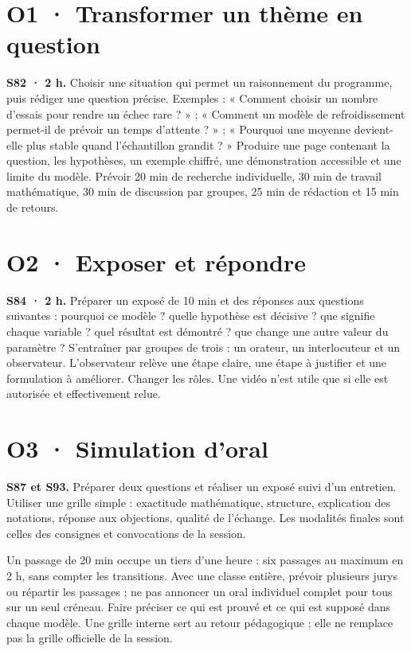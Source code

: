 \section{O1 · Transformer un thème en question}
\textbf{S82 · 2 h.} Choisir une situation qui permet un raisonnement du programme, puis rédiger une question précise. Exemples : « Comment choisir un nombre d'essais pour rendre un échec rare ? » ; « Comment un modèle de refroidissement permet-il de prévoir un temps d'attente ? » ; « Pourquoi une moyenne devient-elle plus stable quand l'échantillon grandit ? »
Produire une page contenant la question, les hypothèses, un exemple chiffré, une démonstration accessible et une limite du modèle. Prévoir 20 min de recherche individuelle, 30 min de travail mathématique, 30 min de discussion par groupes, 25 min de rédaction et 15 min de retours.
\section{O2 · Exposer et répondre}
\textbf{S84 · 2 h.} Préparer un exposé de 10 min et des réponses aux questions suivantes : pourquoi ce modèle ? quelle hypothèse est décisive ? que signifie chaque variable ? quel résultat est démontré ? que change une autre valeur du paramètre ?
S'entraîner par groupes de trois : un orateur, un interlocuteur et un observateur. L'observateur relève une étape claire, une étape à justifier et une formulation à améliorer. Changer les rôles. Une vidéo n'est utile que si elle est autorisée et effectivement relue.
\section{O3 · Simulation d'oral}
\textbf{S87 et S93.} Préparer deux questions et réaliser un exposé suivi d'un entretien. Utiliser une grille simple : exactitude mathématique, structure, explication des notations, réponse aux objections, qualité de l'échange. Les modalités finales sont celles des consignes et convocations de la session.
\ifmxteacher\begin{teachernote}
Un passage de 20 min occupe un tiers d'une heure : six passages au maximum en 2 h, sans compter les transitions. Avec une classe entière, prévoir plusieurs jurys ou répartir les passages ; ne pas annoncer un oral individuel complet pour tous sur un seul créneau. Faire préciser ce qui est prouvé et ce qui est supposé dans chaque modèle. Une grille interne sert au retour pédagogique ; elle ne remplace pas la grille officielle de la session.
\end{teachernote}\fi
